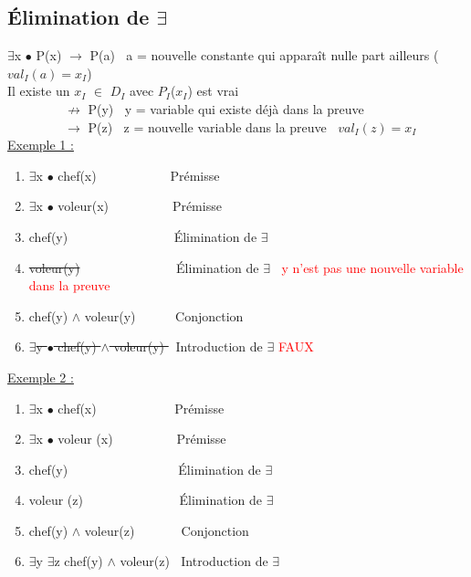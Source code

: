 \begin{flushleft}
\subsection{Élimination de $\exists$}
$\exists$x $\bullet$ P(x) $\rightarrow$ P(a) $\>$ a = nouvelle constante qui apparaît nulle part ailleurs ($val_{I}(a) = x_{I}$)\\
Il existe un $x_{I}$ $\in$ $D_{I}$ avec $P_{I}$($x_{I}$) est vrai\\
$\>$ $\>$ $\>$ $\>$ $\>$ $\>$ $\>$ $\>$ $\nrightarrow$ P(y) $\>$ y = variable qui existe d\'ej\`a dans la preuve \\
$\>$ $\>$ $\>$ $\>$ $\>$ $\>$ $\>$ $\>$ $\rightarrow$ P(z) $\>$ z = nouvelle variable dans la preuve $\>$ $val_{I}(z) = x_{I}$\\
\underline{Exemple 1 :}\\
\begin{enumerate}
\item $\exists$x $\bullet$ chef(x) $\>$ $\>$ $\>$ $\>$ $\>$ $\>$ $\>$ $\>$ $\>$ $\>\>$Pr\'emisse
\item $\exists$x $\bullet$ voleur(x) $\>$ $\>$ $\>$ $\>$ $\>$ $\>$ $\>$ $\>$  $\>$Pr\'emisse
\item chef(y) $\>$ $\>$ $\>$ $\>$ $\>$ $\>$ $\>$ $\>$ $\>$ $\>$ $\>$ $\>$ $\>$ $\>$ $\>$Élimination de $\exists$
\item \sout{voleur(y)} $\>$ $\>$ $\>$ $\>$ $\>$ $\>$ $\>$ $\>$ $\>$ $\>$ $\>$ $\>$ $\>$ Élimination de $\exists$ $\>$ \textcolor{red}{y n'est pas une nouvelle variable dans la preuve}
\item chef(y) $\wedge$ voleur(y) $\>$ $\>$ $\>$ $\>$ $\>$ Conjonction
\item \sout{$\exists$y $\bullet$ chef(y) $\wedge$ voleur(y) $\>$} Introduction de $\exists$ \textcolor{red}{FAUX}
\end{enumerate}

\underline{Exemple 2 :}\\
\begin{enumerate}
\item $\exists$x $\bullet$ chef(x) $\>$ $\>$ $\>$ $\>$ $\>$ $\>$ $\>$ $\>$ $\>$ $\>$ $\>$Pr\'emisse
\item $\exists$x $\bullet$ voleur (x) $\>$ $\>$ $\>$ $\>$ $\>$ $\>$ $\>$ $\>$ $\>$Pr\'emisse
\item chef(y) $\>$ $\>$ $\>$ $\>$ $\>$ $\>$ $\>$ $\>$ $\>$ $\>$ $\>$ $\>$ $\>$ $\>$ $\>$ Élimination de $\exists$
\item voleur (z) $\>$ $\>$ $\>$ $\>$ $\>$ $\>$ $\>$ $\>$ $\>$ $\>$ $\>$ $\>$ $\>$ Élimination de $\exists$
\item chef(y) $\wedge$ voleur(z) $\>$ $\>$ $\>$ $\>$ $\>$ $\>$ Conjonction
\item $\exists$y $\exists$z chef(y) $\wedge$ voleur(z) $\>$ Introduction de $\exists$
\end{enumerate}


\end{flushleft}
